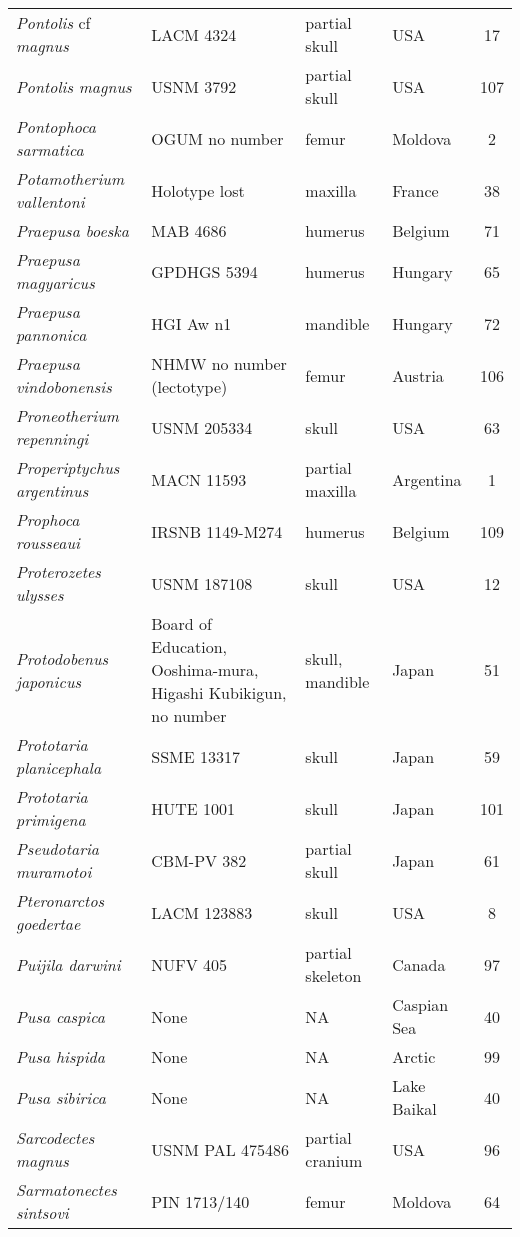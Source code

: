 \begin{longtable}{p{}p{}p{}lc}
\textit{Pontolis} cf \textit{magnus} &	LACM 4324	& partial skull	& USA & 17\\
\textit{Pontolis magnus} &	USNM 3792 & 	partial skull & 	USA & 107\\
\textit{Pontophoca sarmatica} &	OGUM no number	& femur	& Moldova & 2\\
\textit{Potamotherium vallentoni}	 & Holotype lost	& maxilla	& France & 38\\
\textit{Praepusa boeska} &	MAB 4686 & 	humerus & 	Belgium & 	71\\
\textit{Praepusa magyaricus} &	GPDHGS 5394 & 	humerus & 	Hungary & 65\\
\textit{Praepusa pannonica} &	HGI Aw n1 & 	mandible & 	Hungary & 72\\
\textit{Praepusa vindobonensis} &	NHMW no number (lectotype) & 	femur & 	Austria & 106\\
\textit{Proneotherium repenningi} &	USNM 205334 & 	skull & 	USA & 63\\
\textit{Properiptychus argentinus} &	MACN 11593 & 	partial maxilla & 	Argentina & 1\\
\textit{Prophoca rousseaui} &	IRSNB 1149-M274 & 	humerus	 & Belgium	& 109\\
\textit{Proterozetes ulysses} &	USNM 187108 & 	skull & 	USA	 & 12\\
\textit{Protodobenus japonicus} & Board of Education, Ooshima-mura, Higashi Kubikigun, no number & 	skull, mandible & 	Japan & 51\\
\textit{Prototaria planicephala} &	SSME 13317 & 	skull & 	Japan & 59\\
\textit{Prototaria primigena} &	HUTE 1001 & 	skull & 	Japan & 101\\
\textit{Pseudotaria muramotoi} &	CBM-PV 382 & 	partial skull & 	Japan & 61\\
\textit{Pteronarctos goedertae} &	LACM 123883 & 	skull & 	USA	 & 8\\
\textit{Puijila darwini}	& NUFV 405	& partial skeleton	& Canada & 97\\
\textit{Pusa caspica} &	None & 	NA & 	Caspian Sea & 40\\
\textit{Pusa hispida} &	None & 	NA & 	Arctic & 99\\
\textit{Pusa sibirica} &	None & 	NA & 	Lake Baikal & 40\\
\textit{Sarcodectes magnus} &	USNM PAL 475486 & 	partial cranium & 	USA & 96\\
\textit{Sarmatonectes sintsovi}	& PIN 1713/140	& femur	& Moldova & 64\\

\end{longtable}

